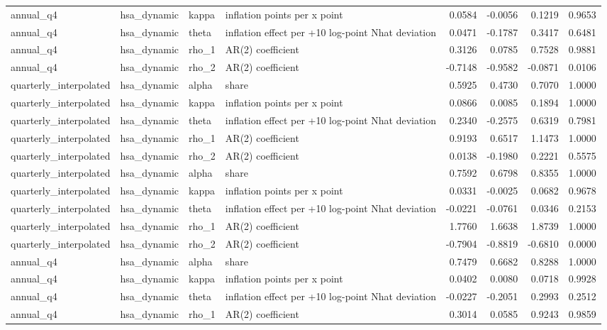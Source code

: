 \begin{tabular}{llllrrrr}
annual\_q4 & hsa\_dynamic & kappa & inflation points per x point & 0.0584 & -0.0056 & 0.1219 & 0.9653 \\
annual\_q4 & hsa\_dynamic & theta & inflation effect per +10 log-point Nhat deviation & 0.0471 & -0.1787 & 0.3417 & 0.6481 \\
annual\_q4 & hsa\_dynamic & rho\_1 & AR(2) coefficient & 0.3126 & 0.0785 & 0.7528 & 0.9881 \\
annual\_q4 & hsa\_dynamic & rho\_2 & AR(2) coefficient & -0.7148 & -0.9582 & -0.0871 & 0.0106 \\
quarterly\_interpolated & hsa\_dynamic & alpha & share & 0.5925 & 0.4730 & 0.7070 & 1.0000 \\
quarterly\_interpolated & hsa\_dynamic & kappa & inflation points per x point & 0.0866 & 0.0085 & 0.1894 & 1.0000 \\
quarterly\_interpolated & hsa\_dynamic & theta & inflation effect per +10 log-point Nhat deviation & 0.2340 & -0.2575 & 0.6319 & 0.7981 \\
quarterly\_interpolated & hsa\_dynamic & rho\_1 & AR(2) coefficient & 0.9193 & 0.6517 & 1.1473 & 1.0000 \\
quarterly\_interpolated & hsa\_dynamic & rho\_2 & AR(2) coefficient & 0.0138 & -0.1980 & 0.2221 & 0.5575 \\
quarterly\_interpolated & hsa\_dynamic & alpha & share & 0.7592 & 0.6798 & 0.8355 & 1.0000 \\
quarterly\_interpolated & hsa\_dynamic & kappa & inflation points per x point & 0.0331 & -0.0025 & 0.0682 & 0.9678 \\
quarterly\_interpolated & hsa\_dynamic & theta & inflation effect per +10 log-point Nhat deviation & -0.0221 & -0.0761 & 0.0346 & 0.2153 \\
quarterly\_interpolated & hsa\_dynamic & rho\_1 & AR(2) coefficient & 1.7760 & 1.6638 & 1.8739 & 1.0000 \\
quarterly\_interpolated & hsa\_dynamic & rho\_2 & AR(2) coefficient & -0.7904 & -0.8819 & -0.6810 & 0.0000 \\
annual\_q4 & hsa\_dynamic & alpha & share & 0.7479 & 0.6682 & 0.8288 & 1.0000 \\
annual\_q4 & hsa\_dynamic & kappa & inflation points per x point & 0.0402 & 0.0080 & 0.0718 & 0.9928 \\
annual\_q4 & hsa\_dynamic & theta & inflation effect per +10 log-point Nhat deviation & -0.0227 & -0.2051 & 0.2993 & 0.2512 \\
annual\_q4 & hsa\_dynamic & rho\_1 & AR(2) coefficient & 0.3014 & 0.0585 & 0.9243 & 0.9859 \\

\end{tabular}
